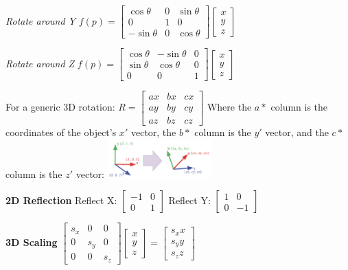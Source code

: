 \documentclass[letterpaper, 8pt]{extarticle}
\begin{document}
\begin{multicols*}{4}
\textit{Rotate around Y}
\(
f(p) = \begin{bmatrix}
    \cos \theta  & 0 & \sin \theta \\
    0            & 1 & 0           \\
    -\sin \theta & 0 & \cos \theta
\end{bmatrix}
\begin{bmatrix}
    x \\ y \\ z
\end{bmatrix}
\)

\textit{Rotate around Z}
\(
f(p) = \begin{bmatrix}
    \cos \theta & -\sin \theta & 0 \\
    \sin \theta & \cos \theta  & 0 \\
    0           & 0            & 1
\end{bmatrix}
\begin{bmatrix}
    x \\ y \\ z
\end{bmatrix}
\)

For a generic 3D rotation:
\(
R =
\begin{bmatrix}
    ax & bx & cx \\
    ay & by & cy \\
    az & bz & cz
\end{bmatrix}
\)
Where the \(a*\) column is the coordinates of the object's \(x'\) vector,
the \(b*\) column is the \(y'\) vector,
and the \(c*\) column is the \(z'\) vector:
\includegraphics[width=4cm]{3d-rotation.png}

\textbf{2D Reflection}
Reflect X:\@
\(
\begin{bmatrix} -1 & 0 \\ 0 & 1 \end{bmatrix}
\)
Reflect Y:\@
\(
\begin{bmatrix} 1 & 0 \\ 0 & -1 \end{bmatrix}
\)

\textbf{3D Scaling}
\(
\begin{bmatrix}
    s_x & 0   & 0   \\
    0   & s_y & 0   \\
    0   & 0   & s_z
\end{bmatrix}
\begin{bmatrix}
    x \\ y \\ z
\end{bmatrix}
=
\begin{bmatrix}
    s_x x \\ s_y y \\ s_z z
\end{bmatrix}
\)


\end{multicols*}
\end{document}
